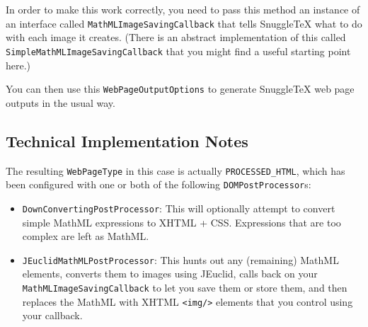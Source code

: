 In order to make this work correctly, you need to pass this method an instance of
an interface called \verb|MathMLImageSavingCallback| that tells SnuggleTeX what to do
with each image it creates. (There is an abstract implementation of this called
\verb|SimpleMathMLImageSavingCallback| that you might find a useful starting point here.)

You can then use this \verb|WebPageOutputOptions| to generate SnuggleTeX web page
outputs in the usual way.

\subsection*{Technical Implementation Notes}

The resulting \verb|WebPageType| in this case is actually \verb|PROCESSED_HTML|,
which has been configured with one or both of the following \verb|DOMPostProcessor|s:

\begin{itemize}
\item \verb|DownConvertingPostProcessor|: This will optionally attempt to convert
simple MathML expressions to XHTML + CSS. Expressions that are too complex are left
as MathML.

\item \verb|JEuclidMathMLPostProcessor|: This hunts out any (remaining) MathML elements,
converts them to images using JEuclid, calls back on your \verb|MathMLImageSavingCallback|
to let you save them or store them, and then replaces the MathML with XHTML
\verb|<img/>| elements that you control using your callback.

\end{itemize}
